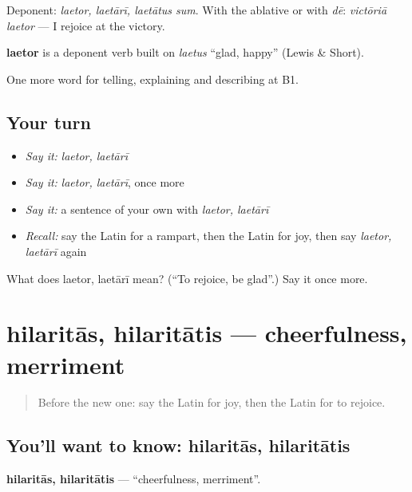 Deponent: \emph{laetor, laetārī, laetātus sum}. With the ablative or with \emph{dē}: \emph{victōriā laetor} — I rejoice at the victory.

\begin{cousinweb}
\textbf{laetor} is a deponent verb built on \emph{laetus} \textquotedblleft{}glad, happy\textquotedblright{} (Lewis \& Short).
\end{cousinweb}

\begin{grammarlens}[title={What you've built}]
One more word for telling, explaining and describing at B1.
\end{grammarlens}

\subsection*{Your turn}
\begin{itemize}
\raggedright
  \item \emph{Say it:} \emph{laetor, laetārī}
  \item \emph{Say it:} \emph{laetor, laetārī}, once more
  \item \emph{Say it:} a sentence of your own with \emph{laetor, laetārī}
  \item \emph{Recall:} say the Latin for a rampart, then the Latin for joy, then say \emph{laetor, laetārī} again
\end{itemize}

\begin{tcolorbox}[breakable,colback=teal!4,colframe=teal!35!black,title={Before you move on}]
What does laetor, laetārī mean? (\textquotedblleft{}To rejoice, be glad\textquotedblright{}.) Say it once more.
\end{tcolorbox}
\section[hilaritās, hilaritātis]{hilaritās, hilaritātis — cheerfulness, merriment}

\label{lesson:LA-C489-hilaritas}



\begin{quote}
Before the new one: say the Latin for joy, then the Latin for to rejoice.
\end{quote}

\subsection*{You'll want to know: hilaritās, hilaritātis}
\textbf{hilaritās, hilaritātis} — \textquotedblleft{}cheerfulness, merriment\textquotedblright{}.

